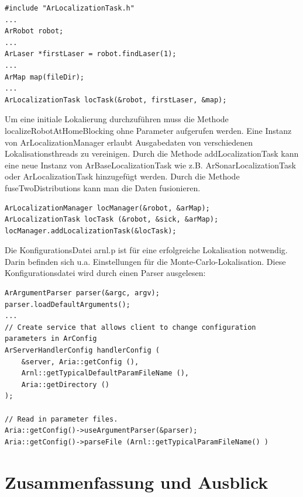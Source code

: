 \documentclass{article}
\begin{document}
\lstset{language=C++}
\begin{lstlisting}
#include "ArLocalizationTask.h"
...
ArRobot robot;
...
ArLaser *firstLaser = robot.findLaser(1);
...
ArMap map(fileDir);
...
ArLocalizationTask locTask(&robot, firstLaser, &map);
\end{lstlisting}
Um eine initiale Lokalierung durchzuf\"uhren muss die Methode localizeRobotAtHomeBlocking ohne Parameter aufgerufen werden.
Eine Instanz von ArLocalizationManager erlaubt Ausgabedaten von verschiedenen Lokalisationsthreads zu vereinigen. Durch die Methode addLocalizationTask kann eine neue Instanz von ArBaseLocalizationTask wie z.B. ArSonarLocalizationTask oder ArLocalizationTask hinzugef\"ugt werden. Durch die Methode fuseTwoDistributions kann man die Daten fusionieren.
\lstset{language=C++}
\begin{lstlisting}
ArLocalizationManager locManager(&robot, &arMap);
ArLocalizationTask locTask (&robot, &sick, &arMap);
locManager.addLocalizationTask(&locTask);
\end{lstlisting}

Die KonfigurationsDatei arnl.p ist f\"ur eine erfolgreiche Lokalisation notwendig. Darin befinden sich u.a. Einstellungen f\"ur die Monte-Carlo-Lokalisation.
Diese Konfigurationsdatei wird durch einen Parser ausgelesen:

\lstset{language=C++}
\begin{lstlisting}
ArArgumentParser parser(&argc, argv);
parser.loadDefaultArguments();
...
// Create service that allows client to change configuration parameters in ArConfig 
ArServerHandlerConfig handlerConfig (
	&server, Aria::getConfig (),
	Arnl::getTypicalDefaultParamFileName (),
	Aria::getDirectory ()
);

// Read in parameter files.
Aria::getConfig()->useArgumentParser(&parser);
Aria::getConfig()->parseFile (Arnl::getTypicalParamFileName() )
\end{lstlisting}

\newpage



\section{Zusammenfassung und Ausblick}



\newpage
\end{document}
